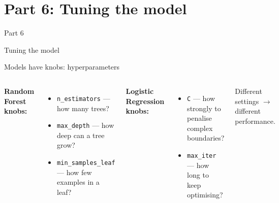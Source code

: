 \documentclass[aspectratio=169, 11pt]{beamer}
\begin{document}
\section{Part 6: Tuning the model}
\begin{frame}
    \centering
    \Huge \textcolor{ausred}{Part 6}

    \vspace{0.5cm}
    \LARGE Tuning the model
\end{frame}

\begin{frame}{Models have knobs: hyperparameters}
    \begin{columns}[T]
        \textbf{Random Forest knobs:}
        \begin{itemize}
            \item \texttt{n\_estimators} — how many trees?
            \item \texttt{max\_depth} — how deep can a tree grow?
            \item \texttt{min\_samples\_leaf} — how few examples in a leaf?
        \end{itemize}

        \vspace{0.3cm}
        \textbf{Logistic Regression knobs:}
        \begin{itemize}
            \item \texttt{C} — how strongly to penalise complex boundaries?
            \item \texttt{max\_iter} — how long to keep optimising?
        \end{itemize}

        \centering

        \vspace{0.5cm}
        Different settings $\rightarrow$ different performance.
    \end{columns}
\end{frame}
\end{document}
